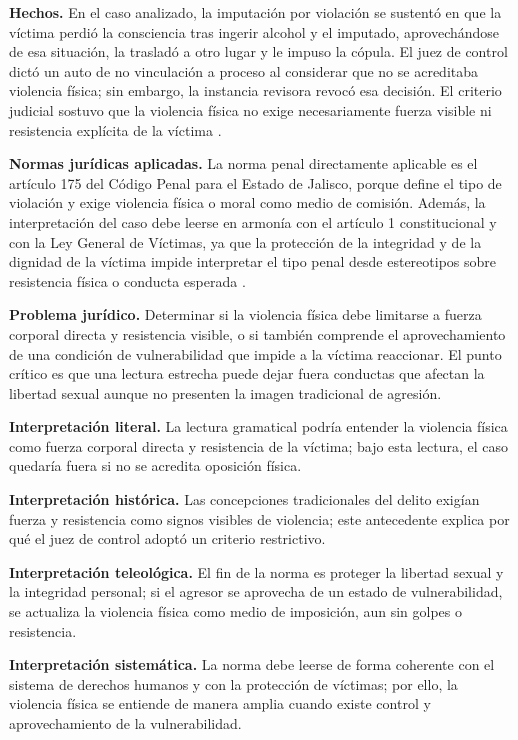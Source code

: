 \documentclass[
	spanish,
	letterpaper, oneside
]{article}
\begin{document}
\textbf{Hechos.} En el caso analizado, la imputación por violación se sustentó en que la víctima perdió la consciencia tras ingerir alcohol y el imputado, aprovechándose de esa situación, la trasladó a otro lugar y le impuso la cópula. El juez de control dictó un auto de no vinculación a proceso al considerar que no se acreditaba violencia física; sin embargo, la instancia revisora revocó esa decisión. El criterio judicial sostuvo que la violencia física no exige necesariamente fuerza visible ni resistencia explícita de la víctima \citep{scjnViolenciaFisica2022}.

\textbf{Normas jurídicas aplicadas.} La norma penal directamente aplicable es el artículo 175 del Código Penal para el Estado de Jalisco, porque define el tipo de violación y exige violencia física o moral como medio de comisión. Además, la interpretación del caso debe leerse en armonía con el artículo 1 constitucional y con la Ley General de Víctimas, ya que la protección de la integridad y de la dignidad de la víctima impide interpretar el tipo penal desde estereotipos sobre resistencia física o conducta esperada \citep{cpeum2026,LeyGeneralVictimas}.

\textbf{Problema jurídico.} Determinar si la violencia física debe limitarse a fuerza corporal directa y resistencia visible, o si también comprende el aprovechamiento de una condición de vulnerabilidad que impide a la víctima reaccionar. El punto crítico es que una lectura estrecha puede dejar fuera conductas que afectan la libertad sexual aunque no presenten la imagen tradicional de agresión.

\textbf{Interpretación literal.} La lectura gramatical podría entender la violencia física como fuerza corporal directa y resistencia de la víctima; bajo esta lectura, el caso quedaría fuera si no se acredita oposición física.

\textbf{Interpretación histórica.} Las concepciones tradicionales del delito exigían fuerza y resistencia como signos visibles de violencia; este antecedente explica por qué el juez de control adoptó un criterio restrictivo.

\textbf{Interpretación teleológica.} El fin de la norma es proteger la libertad sexual y la integridad personal; si el agresor se aprovecha de un estado de vulnerabilidad, se actualiza la violencia física como medio de imposición, aun sin golpes o resistencia.

\textbf{Interpretación sistemática.} La norma debe leerse de forma coherente con el sistema de derechos humanos y con la protección de víctimas; por ello, la violencia física se entiende de manera amplia cuando existe control y aprovechamiento de la vulnerabilidad.
\end{document}
